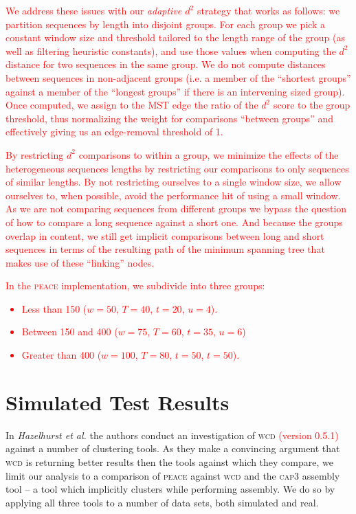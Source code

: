 \documentclass[a4paper,12pt]{article}
\newcommand{\mc}[1]{\textcolor{red}{#1}}
\begin{document}
\begin{appendix}
\mc{We address these issues with our {\it adaptive $d^2$} strategy that
works as follows: we partition sequences by length into disjoint groups.  For each
group we pick a constant window size and threshold tailored to the
length range of the group (as well as filtering heuristic constants),
and use those values when computing the $d^2$ distance for two
sequences in the same group.  We do not compute distances between
sequences in non-adjacent groups (i.e. a member of the ``shortest
groups'' against a member of the ``longest groups'' if there is an
intervening sized group).  Once computed, we assign to the MST
edge the ratio of the $d^2$ score to the group threshold, thus
normalizing the weight for comparisons ``between groups'' and
effectively giving us an edge-removal threshold of 1.}

\mc{By restricting $d^2$ comparisons to within a group, we minimize the
effects of the heterogeneous sequences lengths by restricting our
comparisons to only sequences of similar lengths.  By not restricting
ourselves to a single window size, we allow ourselves to, when possible, avoid the
performance hit of using a small window.  As we are not comparing
sequences from different groups we bypass the question of how to
compare a long sequence against a short one.  And because the
groups overlap in content, we still get implicit comparisons between
long and short sequences in terms of the resulting path of the minimum
spanning tree that makes use of these ``linking'' nodes.}

\mc{In the \textsc{peace} implementation, we subdivide into three groups:
\begin{itemize}
\item Less than 150 ($w=50$, $T=40$, $t=20$, $u=4$).
\item Between 150 and 400 ($w=75$, $T=60$, $t=35$, $u=6$)
\item Greater than 400 ($w=100$, $T=80$, $t=50$, $t=50$).
\end{itemize}}




\section{Simulated Test Results}

In {\it Hazelhurst et al.} \cite{Hazelhurst08a} the authors conduct
an investigation of \textsc{wcd} \mc{(version 0.5.1)} against a number of clustering
tools.  As they make a convincing argument that \textsc{wcd} is returning
better results then the tools against which they compare, we limit our
analysis to a comparison of \textsc{peace} against \textsc{wcd} and the \textsc{cap3} assembly
tool \cite{Huang99} -- a tool which implicitly clusters while
performing assembly.  We do so by applying all three tools to a number
of data sets, both simulated and real.


\end{appendix}
\end{document}
